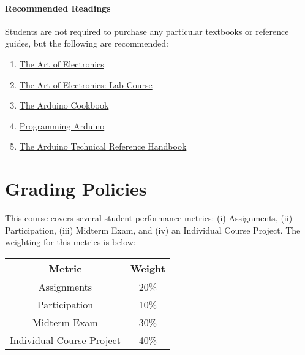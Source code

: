     \paragraph*{Recommended Readings} Students are not required to purchase any particular textbooks or reference guides, but the following are recommended:
    
    \begin{enumerate}
        \item \href{https://www.amazon.com/Art-Electronics-Paul-Horowitz/dp/0521809266/}{The Art of Electronics}
        \item \href{https://www.amazon.com/Learning-Art-Electronics-Hands-Course/dp/0521177235/}{The Art of Electronics: Lab Course}
        \item \href{https://www.amazon.com/Arduino-Cookbook-2nd-Michael-Margolis/dp/1449313876}{The Arduino Cookbook}
        \item \href{https://www.amazon.com/Programming-Arduino-Getting-Started-Sketches/dp/1259641635/}{Programming Arduino}
        \item \href{https://www.amazon.com/Arduino-Technical-Reference-Technicians-Engineers/dp/1491921765/}{The Arduino Technical Reference Handbook}
    \end{enumerate}

\section*{Grading Policies}
This course covers several student performance metrics: (i) Assignments, (ii) Participation, (iii) Midterm Exam, and (iv) an Individual Course Project. The weighting for this metrics is below:

\begin{table*}[ht!]
    \begin{tabular}{c | c}
        \toprule
        Metric                      & Weight \\

        \midrule
        Assignments                 & 20\% \\
        Participation               & 10\% \\
        Midterm Exam                & 30\% \\
        Individual Course Project   & 40\% \\

        \bottomrule
    \end{tabular}
\end{table*}


